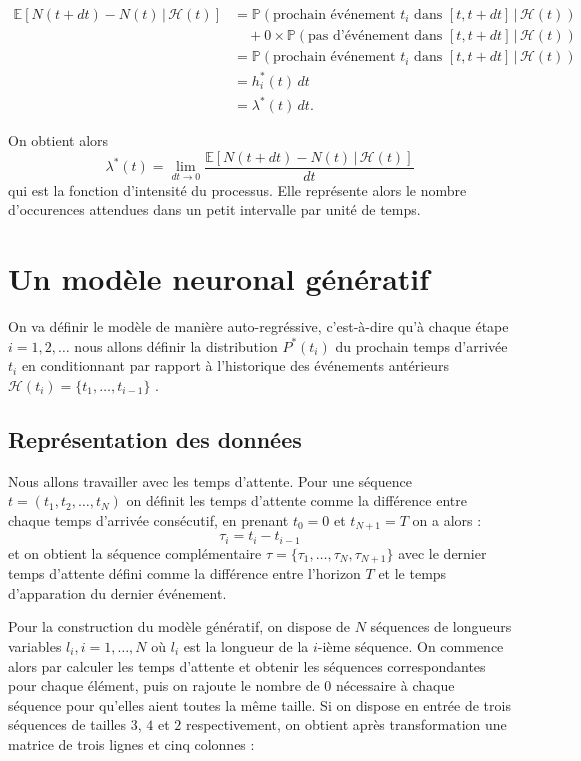 \documentclass{article}
\theoremstyle{definition}
\theoremstyle{remark}
\begin{document}
\begin{align*}
\mathbb{E}\left[N(t + dt) - N(t)\, |\, \mathcal{H}(t)\right]
& = \mathbb{P}(\text{prochain événement } t_i \text{ dans }
[t, t + dt] \, |\,  \mathcal{H}(t)) \\
& \quad + 0 \times \mathbb{P}(\text{pas d'événement dans }
[t, t + dt] \, |\,  \mathcal{H}(t)) \\
& = \mathbb{P}(\text{prochain événement } t_i \text{ dans }
[t, t + dt] \, |\,  \mathcal{H}(t)) \\
& = h^*_i(t)\, dt \\
& = \lambda^*(t)\, dt.
\end{align*}

On obtient alors
$$ \lambda^*(t) = \lim_{dt \to 0}
\frac{\mathbb{E}\left[N(t + dt) - N(t)\, |\, \mathcal{H}(t)\right]}{dt}$$
qui est la fonction d'intensité du processus. Elle représente alors
le nombre d'occurences attendues dans un petit intervalle par unité de temps.

\section{Un modèle neuronal génératif}

On va définir le modèle de manière auto-regréssive, c'est-à-dire qu'à chaque
étape $i = 1, 2, \dots$ nous allons définir la distribution
$P^*(t_i)$ du prochain temps d'arrivée $t_i$ en conditionnant par rapport
à l'historique des événements antérieurs $\mathcal{H}(t_i)
= \{t_1, \dots, t_{i-1}\}$ \cite{shchur2021blog}.

\subsection{Représentation des données}

Nous allons travailler avec les temps d'attente. Pour une séquence
$t = (t_1, t_2, \dots, t_N)$ on définit les temps d'attente comme la
différence entre chaque temps d'arrivée consécutif, en prenant $t_0 = 0$
et $t_{N+1} = T$ on a alors :
$$\tau_i = t_i- t_{i-1}$$ et on obtient la séquence complémentaire
$\tau = \{\tau_1, \dots, \tau_N, \tau_{N+1}\}$ avec le dernier temps d'attente
défini comme la différence entre l'horizon $T$ et le temps d'apparation du
dernier événement.

Pour la construction du modèle génératif, on dispose de $N$ séquences
de longueurs variables $l_i, i = 1, \dots, N$ où $l_i$ est la longueur
de la $i$-ième séquence. On commence alors par calculer les temps d'attente
et obtenir les séquences correspondantes pour chaque élément, puis on rajoute
le nombre de $0$ nécessaire à chaque séquence pour qu'elles aient toutes la
même taille. Si on dispose en entrée de trois séquences de tailles $3$, $4$ et
$2$ respectivement, on obtient après transformation une matrice de
trois lignes et cinq colonnes :
\end{document}
